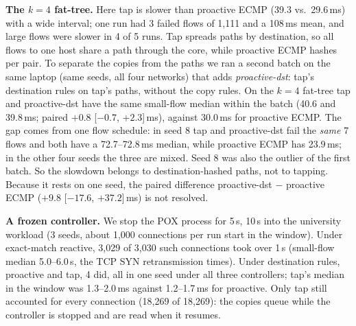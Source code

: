 \documentclass[sigconf]{acmart}
\begin{document}
\textbf{The $k{=}4$ fat-tree.} Here tap is slower than proactive ECMP (39.3 vs.\ 29.6\,ms) with a wide interval; one run had 3 failed flows of 1,111 and a 108\,ms mean, and large flows were slower in 4 of 5 runs. Tap spreads paths by destination, so all flows to one host share a path through the core, while proactive ECMP hashes per pair. To separate the copies from the paths we ran a second batch on the same laptop (same seeds, all four networks) that adds \emph{proactive-dst}: tap's destination rules on tap's paths, without the copy rules. On the $k{=}4$ fat-tree tap and proactive-dst have the same small-flow median within the batch (40.6 and 39.8\,ms; paired $+0.8$ [$-0.7$, $+2.3$]\,ms), against 30.0\,ms for proactive ECMP. The gap comes from one flow schedule: in seed 8 tap and proactive-dst fail the \emph{same} 7 flows and both have a 72.7--72.8\,ms median, while proactive ECMP has 23.9\,ms; in the other four seeds the three are mixed. Seed 8 was also the outlier of the first batch. So the slowdown belongs to destination-hashed paths, not to tapping. Because it rests on one seed, the paired difference proactive-dst $-$ proactive ECMP ($+9.8$ [$-17.6$, $+37.2$]\,ms) is not resolved.

\textbf{A frozen controller.} We stop the POX process for 5\,s, 10\,s into the university workload (3 seeds, about 1,000 connections per run start in the window). Under exact-match reactive, 3,029 of 3,030 such connections took over 1\,s (small-flow median 5.0--6.0\,s, the TCP SYN retransmission times). Under destination rules, proactive and tap, 4 did, all in one seed under all three controllers; tap's median in the window was 1.3--2.0\,ms against 1.2--1.7\,ms for proactive. Only tap still accounted for every connection (18,269 of 18,269): the copies queue while the controller is stopped and are read when it resumes.
\end{document}
